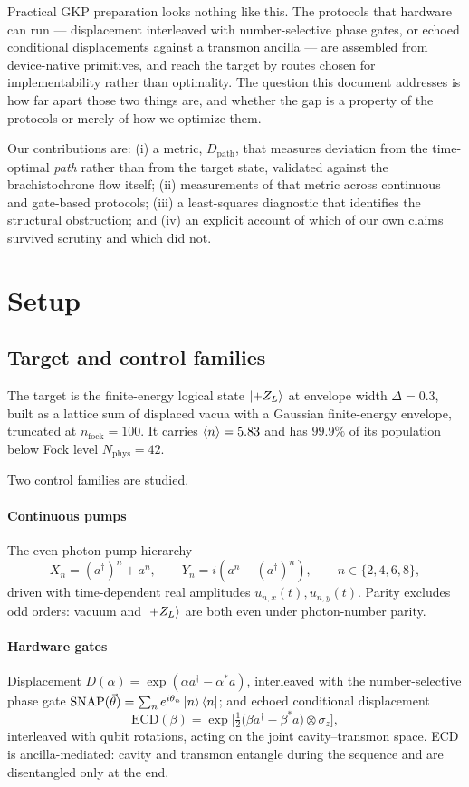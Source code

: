 \documentclass[10pt]{article}
\newcommand{\Dpath}{D_{\mathrm{path}}}
\newcommand{\adag}{a^{\dagger}}
\newcommand{\zL}{\ket{{+}Z_L}}
\begin{document}
Practical GKP preparation looks nothing like this. The protocols that hardware can
run --- displacement interleaved with number-selective phase gates, or echoed
conditional displacements against a transmon ancilla --- are assembled from
device-native primitives, and reach the target by routes chosen for
implementability rather than optimality. The question this document addresses is
how far apart those two things are, and whether the gap is a property of the
protocols or merely of how we optimize them.

Our contributions are: (i) a metric, $\Dpath$, that measures deviation from the
time-optimal \emph{path} rather than from the target state, validated against the
brachistochrone flow itself; (ii) measurements of that metric across continuous
and gate-based protocols; (iii) a least-squares diagnostic that identifies the
structural obstruction; and (iv) an explicit account of which of our own claims
survived scrutiny and which did not.

\section{Setup}

\subsection{Target and control families}

The target is the finite-energy logical state $\zL$ at envelope width
$\Delta=0.3$, built as a lattice sum of displaced vacua with a Gaussian
finite-energy envelope, truncated at $n_{\mathrm{fock}}=100$. It carries
$\braket{n}=5.83$ and has $99.9\%$ of its population below Fock level
$N_{\mathrm{phys}}=42$.

Two control families are studied.

\paragraph{Continuous pumps} The even-photon pump hierarchy
\begin{equation}
X_n = (\adag)^n + a^n, \qquad Y_n = i\left(a^n - (\adag)^n\right),
\qquad n\in\{2,4,6,8\},
\end{equation}
driven with time-dependent real amplitudes $u_{n,x}(t), u_{n,y}(t)$. Parity
excludes odd orders: vacuum and $\zL$ are both even under photon-number parity.

\paragraph{Hardware gates} Displacement
$D(\alpha)=\exp(\alpha \adag - \alpha^* a)$, interleaved with the
number-selective phase gate
$\mathrm{SNAP}(\vec\theta)=\sum_n e^{i\theta_n}\ket{n}\bra{n}$;
and echoed conditional displacement
\begin{equation}
\mathrm{ECD}(\beta)=\exp\!\Big[\tfrac12\big(\beta \adag - \beta^* a\big)\otimes\sigma_z\Big],
\end{equation}
interleaved with qubit rotations, acting on the joint cavity--transmon space. ECD
is ancilla-mediated: cavity and transmon entangle during the sequence and are
disentangled only at the end.
\end{document}
